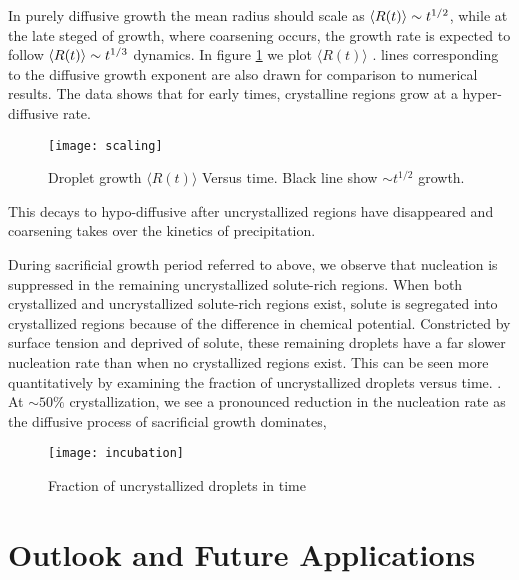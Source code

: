 In purely diffusive growth the mean radius should scale as $\left\langle R(t) \right\rangle \sim
t^{1/2}$, while at the late steged of growth, where coarsening occurs, the growth rate is 
expected to follow  $\left\langle R(t) \right\rangle \sim t^{1/3}$ dynamics. 
In figure \ref{fig:scaling} we plot $\langle R(t)\rangle $ . 
lines corresponding to the diffusive growth exponent are also drawn for comparison to numerical results.
The data shows that for early times, crystalline regions grow at a hyper-diffusive rate. 
%
\begin{figure}
    \centering
    \texttt{[image: scaling]}
    \caption{
        \label{fig:scaling}
        Droplet growth $\langle R(t) \rangle$ Versus time. Black line show $\sim t^{1/2}$ growth. }
\end{figure}
\noindent This decays to hypo-diffusive after uncrystallized regions have disappeared and coarsening takes over the kinetics of precipitation.

During sacrificial growth period referred to above, we observe that nucleation is suppressed in the remaining
uncrystallized solute-rich regions. When both crystallized and uncrystallized
solute-rich regions exist, solute is segregated into crystallized regions
because of the difference in chemical potential. Constricted by surface tension
and deprived of solute, these remaining droplets have a far slower nucleation
rate  than when no crystallized regions exist. This can be seen more
quantitatively by examining the fraction of uncrystallized droplets versus time. . At $\sim 50\%$ crystallization, we see a
pronounced reduction in the nucleation rate as the diffusive process of
sacrificial growth dominates, 
%
\begin{figure}
    \centering
    \texttt{[image: incubation]}
    \caption[Fraction of uncrystallized droplets in time]{
        \label{fig:incubation}
        Fraction of uncrystallized droplets in time
    }
\end{figure}

\section{Outlook and Future Applications} %

